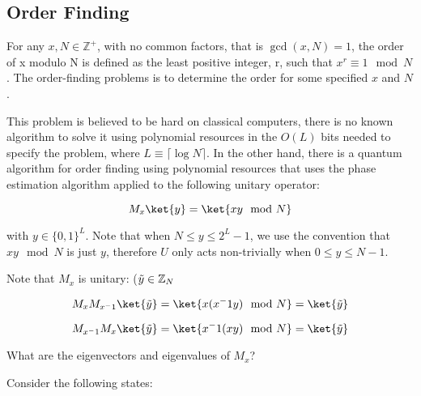 \subsection{Order Finding}
\label{Subsec: Order Finding}

For any $x, N \in \mathds{Z}^+$, with no common factors, that is $\gcd(x,N) = 1$, the order of x modulo N is defined as the least positive integer, r, such that $x^r \equiv 1 \mod N$. The order-finding problems is to determine the order for some specified $x$ and $N$. 

This problem is believed to be hard on classical computers, there is no known algorithm to solve it using polynomial resources in the $O(L)$ bits needed to specify the problem, where $L \equiv \lceil \log N \rceil$. In the other hand, there is a quantum algorithm for order finding using polynomial resources that uses the phase estimation algorithm applied to the following unitary operator:

\begin{equation}
    M_x \ket{y} = \ket{xy \mod N}
\end{equation}

with $y \in \{ 0,1 \}^L$. Note that when $N \leq y \leq 2^L -1$, we use the convention that $xy \mod N$ is just $y$, therefore $U$ only acts non-trivially when $0 \leq y \leq N - 1$.

Note that $M_x$ is unitary: ($\Tilde{y} \in \mathbb{Z}_N$

\begin{equation*}
    M_x M_{x^-1} \ket{\Tilde{y}} = \ket{x(x^-1y) \mod N} = \ket{\Tilde{y}}
\end{equation*}

\begin{equation*}
    M_{x^-1} M_x \ket{\Tilde{y}} = \ket{x^-1(xy) \mod N} = \ket{\Tilde{y}}
\end{equation*}

What are the eigenvectors and eigenvalues of $M_x$?

Consider the following states:

